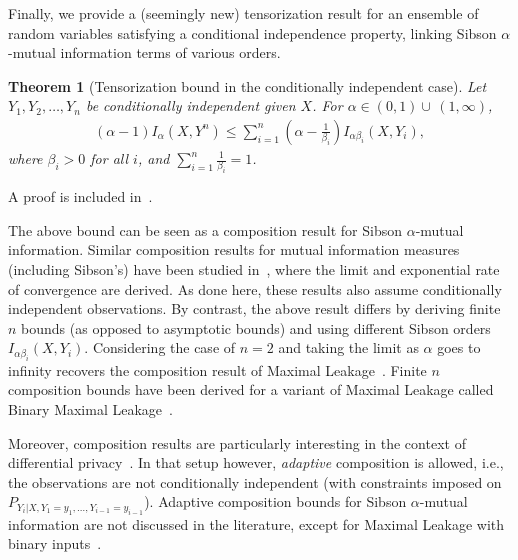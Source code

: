 \documentclass{article}
\newtheorem{theorem}{Theorem}
\numberwithin{theorem}{section}
\numberwithin{example}{section}
\numberwithin{remark}{section}
\numberwithin{definition}{section}
\newcommand{\ds}{\displaystyle}
\newcommand{\revised}[1]{{\color{black} #1}}
\begin{document}
Finally, we provide a (seemingly new) tensorization result \revised{for an ensemble of random variables satisfying a conditional independence property, linking Sibson $\alpha$-mutual information terms of various orders.}

\begin{theorem}[Tensorization bound in the conditionally independent case] \label{thm:tensorization}
    Let $Y_1, Y_2, \ldots, Y_n$ be conditionally independent given $X$. For $\alpha \in (0,1) \cup\, (1,\infty)$,
    \begin{align}
        (\alpha-1) I_\alpha(X, Y^n) \leq  \sum_{i=1}^n \left(\alpha - \frac{1}{\beta_i} \right) I_{\alpha \beta_i} (X,Y_i),        
    \end{align}
    where $\beta_i > 0$ for all $i$, and $\ds \sum_{i=1}^n \frac{1}{\beta_i} =1$.
\end{theorem}

A proof is included in~. \revised{The above bound can be seen as a composition result for Sibson $\alpha$-mutual information. Similar composition results for mutual information measures (including Sibson's) have been studied in~\cite{wuWIS:20}, where the limit and exponential rate of convergence are derived. As done here, these results also assume conditionally independent observations. By contrast, the above result differs by deriving finite $n$ bounds (as opposed to asymptotic bounds) and using different Sibson orders $I_{\alpha \beta_i}(X,Y_i)$. Considering the case of $n=2$ and taking the limit as $\alpha$ goes to infinity recovers the composition result of Maximal Leakage~\cite[Lemma 6]{MaximalLeakage:20}. Finite $n$ composition bounds have been derived for a variant of Maximal Leakage called Binary Maximal Leakage~\cite{cung2024binary}.

Moreover, composition results are particularly interesting in the context of differential privacy~\cite{dwork2010boosting,kairouz2015composition}. In that setup however, \emph{adaptive} composition is allowed, i.e., the observations are not conditionally independent (with constraints imposed on $P_{Y_i|X,Y_1 = y_1, \ldots, Y_{i-1}=y_{i-1}}$). Adaptive composition bounds for Sibson $\alpha$-mutual information are not discussed in the literature, except for Maximal Leakage with binary inputs~\cite{issa2022adaptive}.}
    
\end{document}
